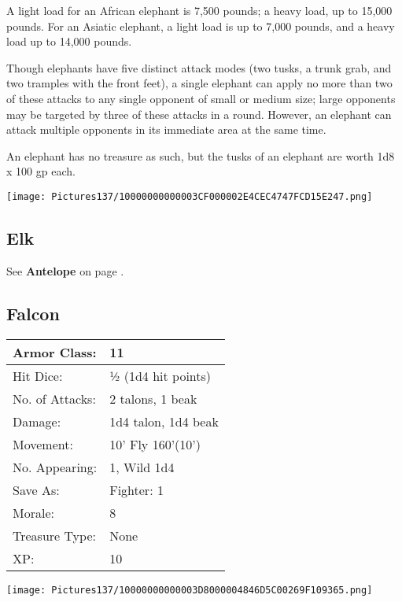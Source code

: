 \documentclass[a4paper,twoside,openany,10pt]{book}
\begin{document}
\begin{multicols}{2}
A light load for an African elephant is 7,500 pounds; a heavy load, up to 15,000 pounds. For an Asiatic elephant, a light load is up to 7,000 pounds, and a heavy load up to 14,000 pounds.

Though elephants have five distinct attack modes (two tusks, a trunk grab, and two tramples with the front feet), a single elephant can apply no more than two of these attacks to any single opponent of small or medium size; large opponents may be targeted by three of these attacks in a round. However, an elephant can attack multiple opponents in its immediate area at the same time.

An elephant has no treasure as such, but the tusks of an elephant are worth 1d8 x 100 gp each.\medskip

\begin{center}
	\texttt{[image: Pictures137/10000000000003CF000002E4CEC4747FCD15E247.png]}
\end{center}

\subsection*{Elk}\label{elk}

See \textbf{Antelope} on page \hyperlink{antelope}{\pageref{antelope}}.

\subsection*{Falcon}\label{falcon}

\begin{tabularx}{0.48\textwidth}{@{}lX@{}}
Armor Class: & 11 \\\hline
Hit Dice: & ½ (1d4 hit points) \\\hline
No. of Attacks: & 2 talons, 1 beak \\\hline
Damage: & 1d4 talon, 1d4 beak \\\hline
Movement: & 10' Fly 160'(10') \\\hline
No. Appearing: & 1, Wild 1d4 \\\hline
Save As: & Fighter: 1 \\\hline
Morale: & 8 \\\hline
Treasure Type: & None \\\hline
XP: & 10 \\\hline
\end{tabularx}\medskip


\begin{center}
	\texttt{[image: Pictures137/10000000000003D8000004846D5C00269F109365.png]}
\end{center}


\end{multicols}
\end{document}
